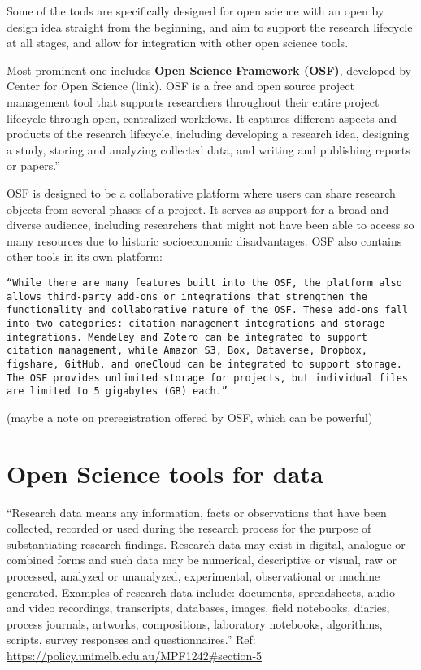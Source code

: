 \documentclass[
  letterpaper,
  DIV=11,
  numbers=noendperiod]{scrreport}
\begin{document}
Some of the tools are specifically designed for open science with an
open by design idea straight from the beginning, and aim to support the
research lifecycle at all stages, and allow for integration with other
open science tools.

Most prominent one includes \textbf{Open Science Framework (OSF)},
developed by Center for Open Science (link). OSF is a free and open
source project management tool that supports researchers throughout
their entire project lifecycle through open, centralized workflows. It
captures different aspects and products of the research lifecycle,
including developing a research idea, designing a study, storing and
analyzing collected data, and writing and publishing reports or
papers.''

OSF is designed to be a collaborative platform where users can share
research objects from several phases of a project. It serves as support
for a broad and diverse audience, including researchers that might not
have been able to access so many resources due to historic socioeconomic
disadvantages. OSF also contains other tools in its own platform:

\begin{verbatim}
“While there are many features built into the OSF, the platform also allows third-party add-ons or integrations that strengthen the functionality and collaborative nature of the OSF. These add-ons fall into two categories: citation management integrations and storage integrations. Mendeley and Zotero can be integrated to support citation management, while Amazon S3, Box, Dataverse, Dropbox, figshare, GitHub, and oneCloud can be integrated to support storage. The OSF provides unlimited storage for projects, but individual files are limited to 5 gigabytes (GB) each.”
\end{verbatim}

(maybe a note on preregistration offered by OSF, which can be powerful)

\hypertarget{open-science-tools-for-data}{%
\section{Open Science tools for
data}\label{open-science-tools-for-data}}

``Research data means any information, facts or observations that have
been collected, recorded or used during the research process for the
purpose of substantiating research findings. Research data may exist in
digital, analogue or combined forms and such data may be numerical,
descriptive or visual, raw or processed, analyzed or unanalyzed,
experimental, observational or machine generated. Examples of research
data include: documents, spreadsheets, audio and video recordings,
transcripts, databases, images, field notebooks, diaries, process
journals, artworks, compositions, laboratory notebooks, algorithms,
scripts, survey responses and questionnaires.'' Ref:
\url{https://policy.unimelb.edu.au/MPF1242\#section-5}
\end{document}
